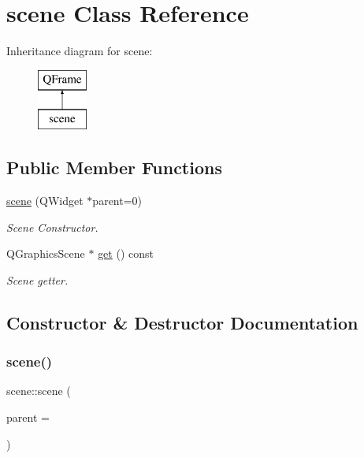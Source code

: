 \hypertarget{classscene}{}\section{scene Class Reference}
\label{classscene}
Inheritance diagram for scene\+:\begin{figure}[H]
\begin{center}
\leavevmode
\includegraphics[height=2.000000cm]{classscene}
\end{center}
\end{figure}
\subsection*{Public Member Functions}
\begin{DoxyCompactItemize}
\item 
\mbox{\hyperlink{classscene_ac93fe52e7b2f23b16705b6cd79ab3d66}{scene}} (Q\+Widget $\ast$parent=0)
\begin{DoxyCompactList}\small\item\em Scene Constructor. \end{DoxyCompactList}\item 
Q\+Graphics\+Scene $\ast$ \mbox{\hyperlink{classscene_a89ba3baf41de3ed6dc530f606d083987}{get}} () const
\begin{DoxyCompactList}\small\item\em Scene getter. \end{DoxyCompactList}\end{DoxyCompactItemize}


\subsection{Constructor \& Destructor Documentation}
\mbox{\label{classscene_ac93fe52e7b2f23b16705b6cd79ab3d66}} 
\subsubsection{\texorpdfstring{scene()}{scene()}}
{\footnotesize\ttfamily scene\+::scene (\begin{DoxyParamCaption}\item[{Q\+Widget $\ast$}]{parent = {} }\end{DoxyParamCaption})\hspace{0.3cm}{\ttfamily [explicit]}}



